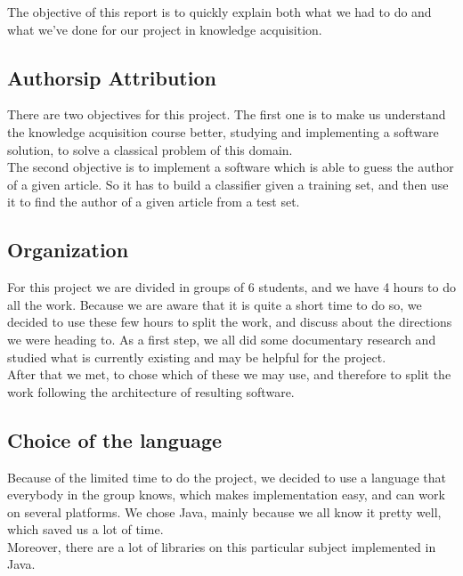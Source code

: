 The objective of this report is to quickly explain both what we had to do and what we've done for our project in knowledge acquisition. 

\subsection{Authorsip Attribution}

There are two objectives for this project. The first one is to make us understand the knowledge acquisition course better, studying and implementing a software solution, to solve a classical problem of this domain.\\
The second objective is to implement a software which is able to guess the author of a given article. So it has to build a classifier given a training set, and then use it to find the author of a given article from a test set.

\subsection{Organization}

For this project we are divided in groups of 6 students, and we have 4 hours to do all the work. Because we are aware that it is quite a short time to do so, we decided to use these few hours to split the work, and discuss about the directions we were heading to. 
As a first step, we all did some documentary research and studied what is currently existing and may be helpful for the project.\\
After that we met, to chose which of these we may use, and therefore to split the work following the architecture of resulting software.

\subsection{Choice of the language}

Because of the limited time to do the project, we decided to use a language that everybody in the group knows, which makes implementation easy, and can work on several platforms. We chose Java, mainly because we all know it pretty well, which saved us a lot of time.\\
Moreover, there are a lot of libraries on this particular subject implemented in Java.